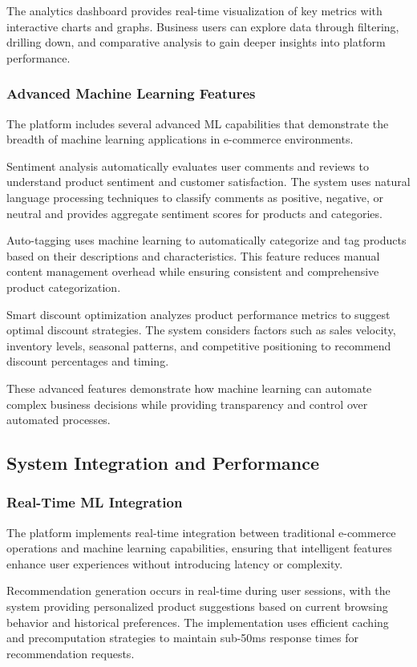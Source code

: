\documentclass[12pt]{article}
\begin{document}
The analytics dashboard provides real-time visualization of key metrics with interactive charts and graphs. Business users can explore data through filtering, drilling down, and comparative analysis to gain deeper insights into platform performance.

\subsubsection{Advanced Machine Learning Features}
The platform includes several advanced ML capabilities that demonstrate the breadth of machine learning applications in e-commerce environments.

Sentiment analysis automatically evaluates user comments and reviews to understand product sentiment and customer satisfaction. The system uses natural language processing techniques to classify comments as positive, negative, or neutral and provides aggregate sentiment scores for products and categories.

Auto-tagging uses machine learning to automatically categorize and tag products based on their descriptions and characteristics. This feature reduces manual content management overhead while ensuring consistent and comprehensive product categorization.

Smart discount optimization analyzes product performance metrics to suggest optimal discount strategies. The system considers factors such as sales velocity, inventory levels, seasonal patterns, and competitive positioning to recommend discount percentages and timing.

These advanced features demonstrate how machine learning can automate complex business decisions while providing transparency and control over automated processes.

\subsection{System Integration and Performance}

\subsubsection{Real-Time ML Integration}
The platform implements real-time integration between traditional e-commerce operations and machine learning capabilities, ensuring that intelligent features enhance user experiences without introducing latency or complexity.

Recommendation generation occurs in real-time during user sessions, with the system providing personalized product suggestions based on current browsing behavior and historical preferences. The implementation uses efficient caching and precomputation strategies to maintain sub-50ms response times for recommendation requests.
\end{document}
